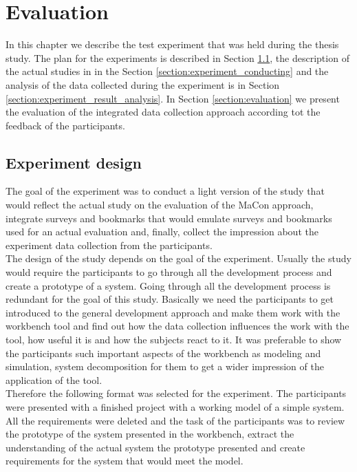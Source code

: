 
\chapter{Evaluation}\label{chapter:evaluation}
In this chapter we describe the test experiment that was held during the thesis study. The plan for the experiments is described in Section \ref{section:experiment_design}, the description of the actual studies in in the Section \ref{section:experiment_conducting} and the analysis of the data collected during the experiment is in Section \ref{section:experiment_result_analysis}. In Section \ref{section:evaluation} we present the evaluation of the integrated data collection approach according tot the feedback of the participants.\\

\section{Experiment design}\label{section:experiment_design}
The goal of the experiment was to conduct a light version of the study that would reflect the actual study on the evaluation of the MaCon approach, integrate surveys and bookmarks that would emulate surveys and bookmarks used for an actual evaluation and, finally, collect the impression about the experiment data collection from the participants.\\

The design of the study depends on the goal of the experiment. Usually the study would require the participants to go through all the development process and create a prototype of a system. Going through all the development process is redundant for the goal of this study. Basically we need the participants to get introduced to the general development approach and make them work with the workbench tool and find out how the data collection influences the work with the tool, how useful it is and how the subjects react to it. It was preferable to show the participants such important aspects of the workbench as modeling and simulation, system decomposition for them to get a wider impression of the application of the tool.\\

Therefore the following format was selected for the experiment. The participants were presented with a finished project with a working model of a simple system. All the requirements were deleted and the task of the participants was to review the prototype of the system presented in the workbench, extract the understanding of the actual system the prototype presented and create requirements for the system that would meet the model.\\

